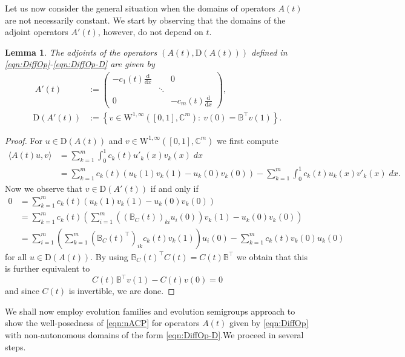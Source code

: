 \documentclass[a4paper,oneside,10pt]{amsart}
\newtheorem{lemma}[theorem]{Lemma}
\theoremstyle{definition}
\numberwithin{equation}{section}
\def\dd{\mathrm{d}}
\def\W{\mathrm{W}}
\def\dom{\mathrm{D}}
\def\BB{\mathbb{B}}
\begin{document}
{Let us now consider the general situation when the domains of operators $A(t)$  are not necessarily constant. We start by observing that the domains of the adjoint operators $A'(t)$, however, do not depend on $t$.
\begin{lemma}\label{lem:adj}
The adjoints of the operators  $(A(t),\dom(A(t)))$ defined in \eqref{eqn:DiffOp}-\eqref{eqn:DiffOp-D} are given  by
\begin{align*}\
A'(t)&:=\begin{pmatrix}
- c_1(t)\frac{\dd}{\dd{x}}& &0\\
& \ddots &\\
0& &- c_m(t)\frac{\dd}{\dd{x}}
\end{pmatrix},\\
\dom(A'(t))&:=\left\{v\in \W^{1,\infty}\left(\left[0,1\right],\mathbb{C}^m\right):\ v(0)=\mathbb{B}^{\top}v(1)\right\}.
\label{eqn:DiffOp-DAdj}
\end{align*}
\end{lemma}
\begin{proof}
For $u\in \dom(A(t))$ and $v\in \W^{1,\infty}\left(\left[0,1\right],\mathbb{C}^m\right)$ we first compute
 \begin{align*}
 \langle A(t)  u,v\rangle &= \sum_{k=1}^m \int_0^1 c_k(t) u'_k(x) v_k(x) \; dx \\
 &= \sum_{k=1}^m  c_k(t) \left(u_k(1) v_k(1) -  u_k(0) v_k(0) \right) -\sum_{k=1}^m \int_0^1 c_k(t) u_k(x) v'_k(x) \; dx.
 \end{align*}
 Now we observe that $v \in \dom(A'(t))$ if and only if 
 \begin{align*}
 0 &=   \sum_{k=1}^m  c_k(t) \left(u_k(1) v_k(1) -  u_k(0) v_k(0) \right) \\
 &=\sum_{k=1}^m  c_k(t)  \left( \sum_{i=1}^m \left(\left(\BB_C(t)\right)_{ki} u_i(0) \right)v_k(1) -  u_k(0) v_k(0) \right)  \\
  &=  \sum_{i=1}^m \left( \sum_{k=1}^m  \left(\BB_C(t)^{\top}\right)_{ik} c_k(t)  v_k(1) \right) u_i(0)  -  \sum_{k=1}^m c_k(t) v_k(0) u_k(0)
  \end{align*}
  for all  $u\in \dom(A(t))$. By using $\BB_C(t) ^{\top} C(t) = C(t) \BB^{\top} $ we  obtain that this is further equivalent to 
\[C(t) \BB^{\top}  v(1) - C(t) v(0)=0\]
and since $C(t)$ is invertible, we are done.
\end{proof}
}

We {shall now employ} evolution families and evolution semigroups approach to show the well-posedness of \eqref{eqn:nACP} 
for operators $A(t)$ given by \eqref{eqn:DiffOp} with non-autonomous domains of the form \eqref{eqn:DiffOp-D}.{We proceed in several steps.}
\end{document}
